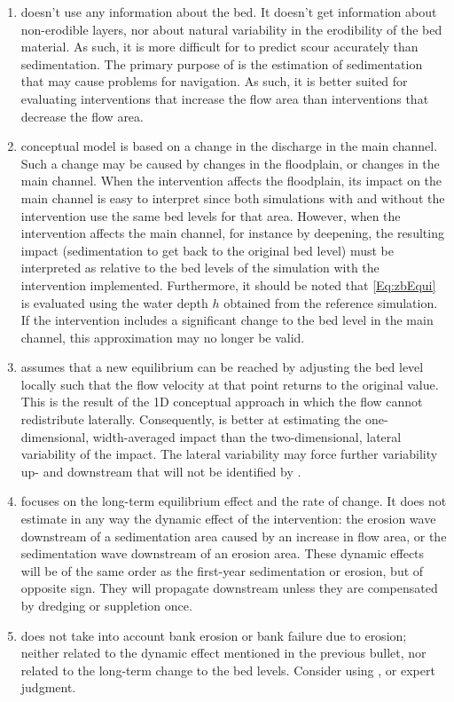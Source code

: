 \begin{enumerate}
\item \dfastmi doesn't use any information about the bed.
It doesn't get information about non-erodible layers, nor about natural variability in the erodibility of the bed material.
As such, it is more difficult for \dfmi to predict scour accurately than sedimentation.
The primary purpose of \dfmi is the estimation of sedimentation that may cause problems for navigation.
As such, it is better suited for evaluating interventions that increase the flow area than interventions that decrease the flow area.

\item \dfastmi conceptual model is based on a change in the discharge in the main channel.
Such a change may be caused by changes in the floodplain, or changes in the main channel.
When the intervention affects the floodplain, its impact on the main channel is easy to interpret since both simulations with and without the intervention use the same bed levels for that area.
However, when the intervention affects the main channel, for instance by deepening, the resulting impact (sedimentation to get back to the original bed level) must be interpreted as relative to the bed levels of the simulation with the intervention implemented.
Furthermore, it should be noted that \autoref{Eq:zbEqui} is evaluated using the water depth $h$ obtained from the reference simulation.
If the intervention includes a significant change to the bed level in the main channel, this approximation may no longer be valid.

\item \dfastmi assumes that a new equilibrium can be reached by adjusting the bed level locally such that the flow velocity at that point returns to the original value.
This is the result of the 1D conceptual approach in which the flow cannot redistribute laterally.
Consequently, \dfmi is better at estimating the one-dimensional, width-averaged impact than the two-dimensional, lateral variability of the impact.
The lateral variability may force further variability up- and downstream that will not be identified by \dfmi.

\item \dfastmi focuses on the long-term equilibrium effect and the rate of change.
It does not estimate in any way the dynamic effect of the intervention: the erosion wave downstream of a sedimentation area caused by an increase in flow area, or the sedimentation wave downstream of an erosion area.
These dynamic effects will be of the same order as the first-year sedimentation or erosion, but of opposite sign.
They will propagate downstream unless they are compensated by dredging or suppletion once.

\item \dfastmi does not take into account bank erosion or bank failure due to erosion; neither related to the dynamic effect mentioned in the previous bullet, nor related to the long-term change to the bed levels.
Consider using \dfastbe, or expert judgment.

\end{enumerate}
